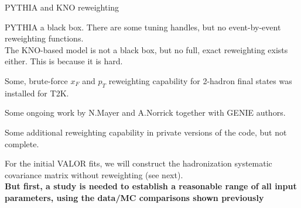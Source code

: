 \begin{frame}{PYTHIA and KNO reweighting}

PYTHIA a black box. There are some tuning handles, but no event-by-event reweighting functions.\\
\vspace{0.3cm}
The KNO-based model is not a black box, but no full, exact reweighting exists either.
This is because it is hard.
\begin{itemize}
 {\small
  \item Some, brute-force $x_{F}$ and $p_{T}$ reweighting capability for 2-hadron final states was installed for T2K.
  \item Some ongoing work by N.Mayer and A.Norrick together with GENIE authors.
  \item Some additional reweighting capability in private versions of the code, but not complete.
 }
\end{itemize}

For the initial VALOR fits, we will construct the hadronization systematic covariance matrix without reweighting (see next).\\

{\bf But first, a study is needed to establish a reasonable range of all input parameters, using the data/MC comparisons shown previously}

\end{frame}


